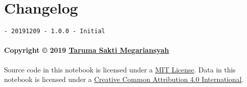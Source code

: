 \documentclass[11pt]{article}
\begin{document}
    \hypertarget{changelog}{%
\section{Changelog}\label{changelog}}

\begin{verbatim}
- 20191209 - 1.0.0 - Initial
\end{verbatim}

\hypertarget{copyright-2019-taruma-sakti-megariansyah}{%
\paragraph{\texorpdfstring{Copyright © 2019
\href{https://taruma.github.io}{Taruma Sakti
Megariansyah}}{Copyright © 2019 Taruma Sakti Megariansyah}}\label{copyright-2019-taruma-sakti-megariansyah}}

Source code in this notebook is licensed under a
\href{https://choosealicense.com/licenses/mit/}{MIT License}. Data in
this notebook is licensed under a
\href{https://creativecommons.org/licenses/by/4.0/}{Creative Common
Attribution 4.0 International}.


    
    
    
\end{document}
